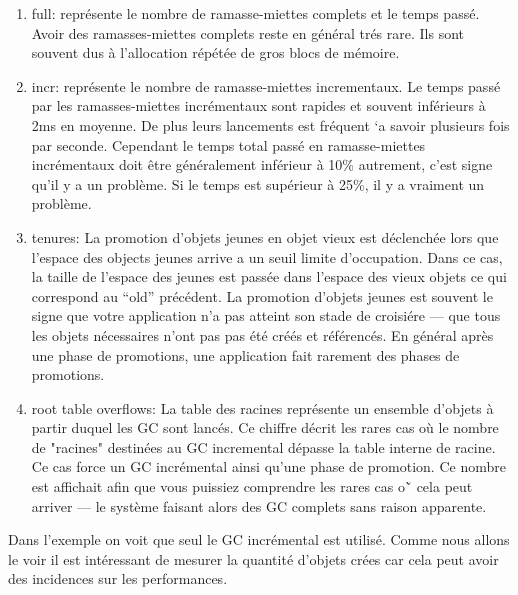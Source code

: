 \documentclass[a4paper,10pt,twoside]{book}
\begin{document}
\begin{enumerate}
\item full: repr\'esente le nombre de ramasse-miettes complets et le
  temps pass\'e. Avoir des ramasses-miettes complets reste en
  g\'en\'eral tr\'es rare. Ils sont souvent dus \`a l'allocation
  r\'ep\'et\'ee de gros blocs de m\'emoire. 

\item incr: repr\'esente le nombre de ramasse-miettes incrementaux. Le
  temps pass\'e par les ramasses-miettes incr\'ementaux sont rapides
  et souvent inf\'erieurs \`a 2ms en moyenne. De plus leurs lancements
  est fr\'equent `a savoir plusieurs fois par seconde. Cependant 
le temps total pass\'e en ramasse-miettes incr\'ementaux doit \^etre g\'en\'eralement inf\'erieur \`a 10\% autrement, c'est signe qu'il y a un probl\`eme. Si le temps est sup\'erieur \`a 25\%, il y a vraiment un probl\`eme.

\item tenures: La promotion d'objets jeunes en objet vieux est
  d\'eclench\'ee lors que l'espace des objects jeunes arrive a un
  seuil limite d'occupation. Dans ce cas, la taille de l'espace des
  jeunes est pass\'ee dans l'espace des vieux objets ce qui correspond
  au ``old'' pr\'ec\'edent. La promotion d'objets jeunes  est souvent
  le signe que votre application n'a pas atteint son stade de
  croisi\'ere --- que tous les objets n\'ecessaires n'ont pas pas
  \'et\'e cr\'e\'es et r\'ef\'erenc\'es. En g\'en\'eral apr\`es une
  phase de promotions, une application fait rarement des phases de
  promotions. 

\item root table overflows: La table des racines repr\'esente un
  ensemble d'objets \`a partir duquel les GC sont lanc\'es. Ce chiffre
  d\'ecrit les rares cas o\`u le nombre de "racines" destin\'ees au
GC incremental d\'epasse la table interne de racine. Ce cas force un
GC incr\'emental ainsi qu'une phase de promotion. Ce nombre est
affichait afin que vous puissiez comprendre les rares cas o\u` cela
peut arriver --- le syst\`eme faisant alors des GC complets sans
raison apparente. 
\end{enumerate}


Dans l'exemple on voit que seul le GC incr\'emental est utilis\'e. 
Comme nous allons le voir il est int\'eressant de mesurer la
quantit\'e d'objets cr\'ees car cela peut avoir des incidences sur les
performances.
\end{document}
